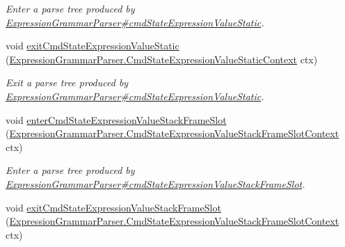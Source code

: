 \begin{DoxyCompactItemize}
\begin{DoxyCompactList}\small\item\em Enter a parse tree produced by \hyperlink{classgov_1_1nasa_1_1jpf_1_1inspector_1_1server_1_1expression_1_1parser_1_1_expression_grammar_parser_abeaf7544d2fb53e23e913f8d829ba78e}{Expression\+Grammar\+Parser\#cmd\+State\+Expression\+Value\+Static}. \end{DoxyCompactList}\item 
void \hyperlink{interfacegov_1_1nasa_1_1jpf_1_1inspector_1_1server_1_1expression_1_1parser_1_1_expression_grammar_listener_a1e92dc68e4ef438b5905bcff80ca8e08}{exit\+Cmd\+State\+Expression\+Value\+Static} (\hyperlink{classgov_1_1nasa_1_1jpf_1_1inspector_1_1server_1_1expression_1_1parser_1_1_expression_grammar_pa08e6165e66cacb4d3382a343315ee767}{Expression\+Grammar\+Parser.\+Cmd\+State\+Expression\+Value\+Static\+Context} ctx)
\begin{DoxyCompactList}\small\item\em Exit a parse tree produced by \hyperlink{classgov_1_1nasa_1_1jpf_1_1inspector_1_1server_1_1expression_1_1parser_1_1_expression_grammar_parser_abeaf7544d2fb53e23e913f8d829ba78e}{Expression\+Grammar\+Parser\#cmd\+State\+Expression\+Value\+Static}. \end{DoxyCompactList}\item 
void \hyperlink{interfacegov_1_1nasa_1_1jpf_1_1inspector_1_1server_1_1expression_1_1parser_1_1_expression_grammar_listener_a11c4fe90a257bdee2063c41ee86e93f7}{enter\+Cmd\+State\+Expression\+Value\+Stack\+Frame\+Slot} (\hyperlink{classgov_1_1nasa_1_1jpf_1_1inspector_1_1server_1_1expression_1_1parser_1_1_expression_grammar_pa53e28d24e840d016fb7c58b2b73008ab}{Expression\+Grammar\+Parser.\+Cmd\+State\+Expression\+Value\+Stack\+Frame\+Slot\+Context} ctx)
\begin{DoxyCompactList}\small\item\em Enter a parse tree produced by \hyperlink{classgov_1_1nasa_1_1jpf_1_1inspector_1_1server_1_1expression_1_1parser_1_1_expression_grammar_parser_a6b064d2ec6f62d4260a820ef3c1864e9}{Expression\+Grammar\+Parser\#cmd\+State\+Expression\+Value\+Stack\+Frame\+Slot}. \end{DoxyCompactList}\item 
void \hyperlink{interfacegov_1_1nasa_1_1jpf_1_1inspector_1_1server_1_1expression_1_1parser_1_1_expression_grammar_listener_aa381c858eb193a0d2151e917962292e0}{exit\+Cmd\+State\+Expression\+Value\+Stack\+Frame\+Slot} (\hyperlink{classgov_1_1nasa_1_1jpf_1_1inspector_1_1server_1_1expression_1_1parser_1_1_expression_grammar_pa53e28d24e840d016fb7c58b2b73008ab}{Expression\+Grammar\+Parser.\+Cmd\+State\+Expression\+Value\+Stack\+Frame\+Slot\+Context} ctx)

\end{DoxyCompactItemize}
